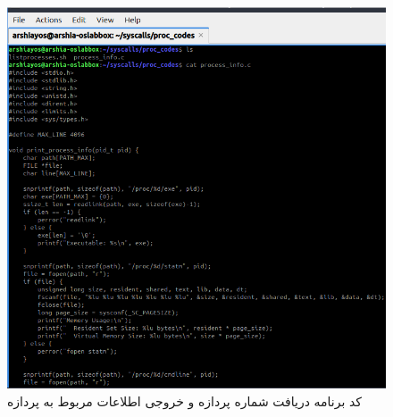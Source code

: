 \documentclass[12pt]{article}
\begin{document}
	\begin{figure}[H]
		\centering
		\includegraphics[width=\textwidth]{report3-resources/16.png}
		\caption{کد برنامه‌ دریافت شماره پردازه و خروجی اطلاعات مربوط به پردازه}
		\label{fig:15}
	\end{figure}
\end{document}
